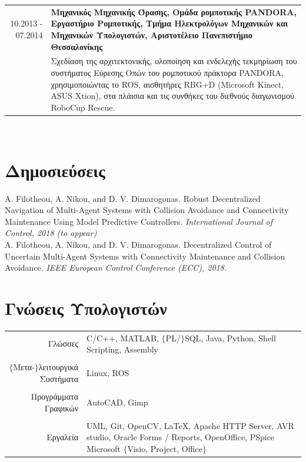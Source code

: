 \documentclass[a4paper,10pt,twoside]{article}
\begin{document}
\begin{tabular}{rp{12cm}}
10.2013 - 07.2014 & \textbf{Μηχανικός Μηχανικής Όρασης, Ομάδα ρομποτικής PANDORA, Εργαστήριο Ρομποτικής,
                    Τμήμα Ηλεκτρολόγων Μηχανικών και Μηχανικών Υπολογιστών, Αριστοτέλειο Πανεπιστήμιο Θεσσαλονίκης} \\
                  & Σχεδίαση της αρχιτεκτονικής, υλοποίηση και ενδελεχής τεκμηρίωση
                    του συστήματος Εύρεσης Οπών του ρομποτικού πράκτορα PANDORA, χρησιμοποιώντας το ROS, αισθητήρες RBG+D
                    (Microsoft Kinect, ASUS Xtion), στα πλάισια και τις συνθήκες του διεθνούς διαγωνισμού RoboCup Rescue.\\
\end{tabular} \\

\section{Δημοσιεύσεις}

A. Filotheou, A. Nikou, and D. V. Dimarogonas. Robust Decentralized Navigation
of Multi-Agent Systems with Collision Avoidance and Connectivity Maintenance
Using Model Predictive Controllers. \textit{International Journal of Control, 2018 (to appear)}\\

A. Filotheou, A. Nikou, and D. V. Dimarogonas. Decentralized Control of Uncertain
Multi-Agent Systems with Connectivity Maintenance and Collision Avoidance.
\textit{IEEE European Control Conference (ECC), 2018.}\\





\section{Γνώσεις Υπολογιστών}

\begin{tabular}{rp{9cm}}
Γλώσσες & C/C++, MATLAB, $\{$PL/$\}$SQL, Java, Python, Shell Scripting, Assembly \\
&\\
$\{$Μετα-$\}$λειτουργικά Συστήματα & Linux, ROS \\
&\\
Προγράμματα Γραφικών & AutoCAD, Gimp\\
&\\
Εργαλεία & UML, Git, OpenCV, \LaTeX, Apache HTTP Server, AVR studio,
   Oracle Forms / Reports, OpenOffice, PSpice
   Microsoft $\{$Visio, Project, Office$\}$
\end{tabular}
\end{document}

